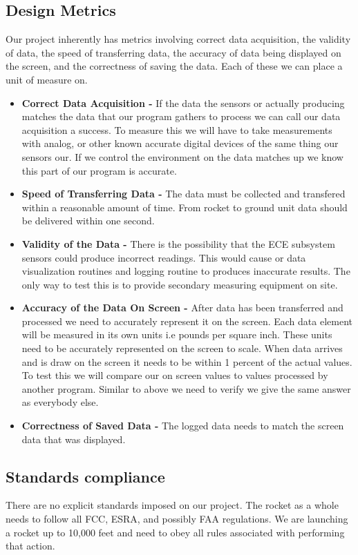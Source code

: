 \documentclass[10pt,draftclsnofoot,onecolumn,compsoc]{IEEEtran}
\begin{document}
\subsection{Design Metrics}
Our project inherently has metrics involving correct data acquisition, the validity of data, the speed of transferring data, the accuracy of data being displayed on the screen, and the correctness of saving the data. Each of these we can place a unit of measure on. \par
\begin{itemize}
\item{\bf Correct Data Acquisition - } If the data the sensors or actually producing matches the data that our program gathers to process we can call our data acquisition a success. To measure this we will have to take measurements with analog, or other known accurate digital devices of the same thing our sensors our. If we control the environment on the data matches up we know this part of our program is accurate. 
\item{\bf Speed of Transferring Data -} The data must be collected and transfered within a reasonable amount of time. From rocket to ground unit data should be delivered within one second.
\item{\bf Validity of the Data - } There is the possibility that the ECE subsystem sensors could produce incorrect readings. This would cause or data visualization routines and logging routine to produces inaccurate results. The only way to test this is to provide secondary measuring equipment on site.
\item{\bf Accuracy of the Data On Screen - } After data has been transferred and processed we need to accurately represent it on the screen. Each data element will be measured in its own units i.e pounds per square inch. These units need to be accurately represented on the screen to scale. When data arrives and is draw on the screen it needs to be within 1 percent of the actual values. To test this we will compare our on screen values to values processed by another program. Similar to above we need to verify we give the same answer as everybody else.
\item{\bf Correctness of Saved Data - } The logged data needs to match the screen data that was displayed.
\end{itemize}

\subsection{Standards compliance}
There are no explicit standards imposed on our project. The rocket as a whole needs to follow all FCC, ESRA, and possibly FAA regulations. We are launching a rocket up to 10,000 feet and need to obey all rules associated with performing that action.
\end{document}
